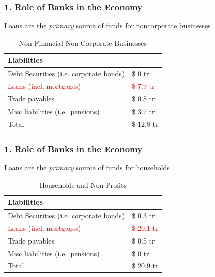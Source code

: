 \documentclass{beamer}
\begin{document}
\begin{frame}[t]
    \frametitle{1. Role of Banks in the Economy}

    Loans are the \textit{primary} source of funds for noncorporate businesses

    \begin{table}[h]
        \centering
        \caption{Non-Financial Non-Corporate Businesses}
        \label{tab:placeholder_label}
        \begin{tabular}{l>{\raggedleft\arraybackslash}p{2cm}}
            \hline
            \textbf{Liabilities}\\
             \hline
            Debt Securities (i.e. corporate bonds) & \$ 0 tr \\
            \textcolor{red}{Loans (incl. mortgages)} & \textcolor{red}{\$ 7.9 tr}\\
            Trade payables & \$ 0.8 tr \\            
            Misc liabilities (i.e.\ pensions) & \$ 3.7 tr\\
            \hline
            Total & \$ 12.8 tr \\
            \hline
        \end{tabular}
    \end{table}


\end{frame}

\begin{frame}[t]
    \frametitle{1. Role of Banks in the Economy}

    Loans are the \textit{primary} source of funds for households

    \begin{table}[h]
        \centering
        \caption{Households and Non-Profits}
        \label{tab:placeholder_label}
        \begin{tabular}{l>{\raggedleft\arraybackslash}p{2cm}}
            \hline
            \textbf{Liabilities}\\
             \hline
            Debt Securities (i.e. corporate bonds) & \$ 0.3 tr \\
            \textcolor{red}{Loans (incl. mortgages)} & \textcolor{red}{\$ 20.1 tr}\\
            Trade payables & \$ 0.5 tr \\            
            Misc liabilities (i.e.\ pensions) & \$ 0 tr\\
            \hline
            Total & \$ 20.9 tr \\
            \hline
        \end{tabular}
    \end{table}


\end{frame}
\end{document}
